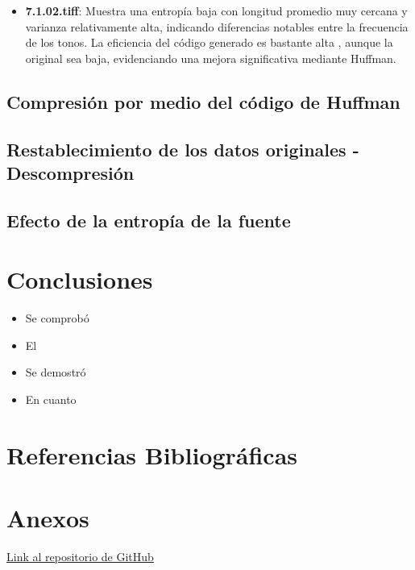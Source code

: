 \documentclass[conference,onecolumn,12pt]{IEEEtran}
\numberwithin{equation}{subsection}
\begin{document}
\begin{itemize}
    \item \textbf{7.1.02.tiff}: Muestra una entropía baja con longitud promedio muy cercana y varianza relativamente alta, indicando diferencias notables entre la frecuencia de los tonos. La eficiencia del código generado es bastante alta , aunque la original sea baja, evidenciando una mejora significativa mediante Huffman.
    
\end{itemize}

\subsection{Compresión por medio del código de Huffman}

\subsection{Restablecimiento de los datos originales - Descompresión}

\subsection{Efecto de la entropía de la fuente}

\section{Conclusiones} 

\begin{itemize}

\item Se comprobó 

\item El 

\item Se demostró 

\item  En cuanto

\end{itemize}


\section{Referencias Bibliográficas}
\printbibliography[heading=none]

\section{Anexos}

\href{https://github.com/NagelMS/Tarea2_CE2.git}{Link al repositorio de GitHub}
\end{document}
